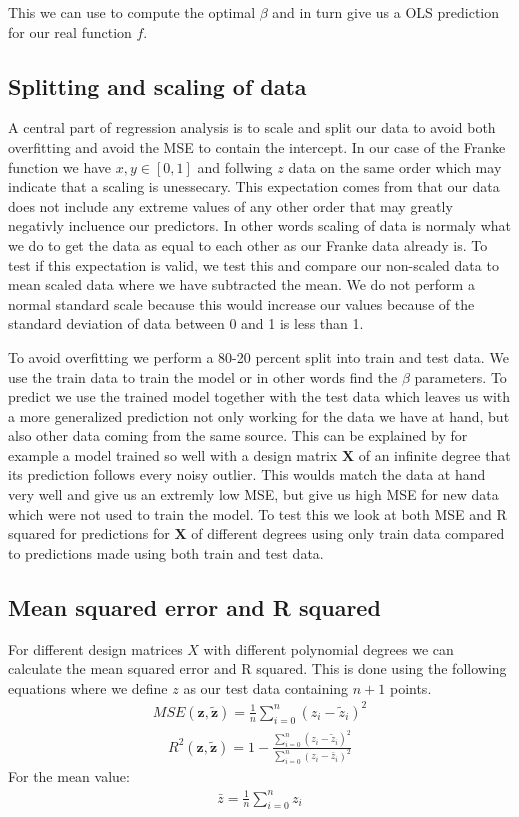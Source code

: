 \documentclass[12pt]{article}
\begin{document}
This we can use to compute the optimal $\beta$ and in turn give us a OLS prediction for our real function $f$.

\subsection{Splitting and scaling of data}
A central part of regression analysis is to scale and split our data to avoid both overfitting and avoid the MSE to contain the intercept. In our case of the Franke function we have $x,y \in [0,1]$ and follwing $z$ data on the same order which may indicate that a scaling is unessecary. This expectation comes from that our data does not include any extreme values of any other order that may greatly negativly incluence our predictors. In other words scaling of data is normaly what we do to get the data as equal to each other as our Franke data already is. To test if this expectation is valid, we test this and compare our non-scaled data to mean scaled data where we have subtracted the mean. We do not perform a normal standard scale because this would increase our values because of the standard deviation of data between 0 and 1 is less than 1.

To avoid overfitting we perform a 80-20 percent split into train and test data. We use the train data to train the model or in other words find the $\beta$ parameters. To predict we use the trained model together with the test data which leaves us with a more generalized prediction not only working for the data we have at hand, but also other data coming from the same source. This can be explained by for example a model trained so well with a design matrix $\boldsymbol{X}$ of an infinite degree that its prediction follows every noisy outlier. This woulds match the data at hand very well and give us an extremly low MSE, but give us high MSE for new data which were not used to train the model. To test this we look at both MSE and R squared for predictions for $\boldsymbol{X}$ of different degrees using only train data compared to predictions made using both train and test data.

\subsection{Mean squared error and R squared}
For different design matrices $X$ with different polynomial degrees we can calculate the mean squared error and R squared. This is done using the following equations where we define $z$ as our test data containing $n+1$ points.
\begin{align*}
  MSE(\boldsymbol{z}, \boldsymbol{\tilde{z}}) = \frac{1}{n }\sum_{i=0}^{n}(z_i- \tilde{z}_i)^2
\end{align*}
\begin{align*}
  R^2(\boldsymbol{z}, \boldsymbol{\tilde{z}}) = 1 - \frac{\sum_{i=0}^{n}(z_i- \tilde{z}_i)^2}{\sum_{i=0}^{n}(z_i- \bar{z}_i)^2}
\end{align*}
For the mean value:
\begin{align*}
  \bar{z} = \frac{1}{n }\sum_{i=0}^{n}z_i
\end{align*}
\end{document}
